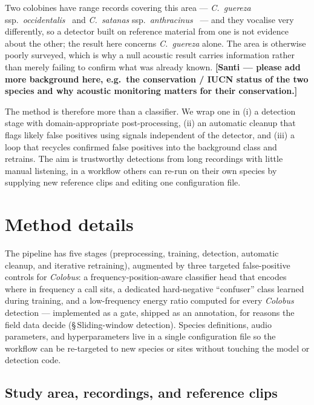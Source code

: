 \documentclass[review,3p,times]{elsarticle}
\begin{document}
Two colobines have range records covering this area --- \textit{C.\ guereza}
ssp.\ \textit{occidentalis}~\cite{iucnguereza2025} and \textit{C.\ satanas}
ssp.\ \textit{anthracinus}~\cite{iucnsatanas2020} --- and they vocalise very
differently, so a detector built on reference material from one is not evidence
about the other; the result here concerns \textit{C.\ guereza} alone. The area
is otherwise poorly surveyed, which is why a null acoustic result carries
information rather than merely failing to confirm what was already known.
\textbf{[Santi --- please add more background here, e.g.\ the conservation /
IUCN status of the two species and why acoustic monitoring matters for their
conservation.]}

The method is therefore more than a classifier. We wrap one in (i) a detection stage with
domain-appropriate post-processing, (ii) an automatic cleanup that flags likely
false positives using signals independent of the detector, and (iii) a loop that
recycles confirmed false positives into the background class and retrains. The
aim is trustworthy detections from long recordings with little manual listening,
in a workflow others can re-run on their own species by supplying new reference
clips and editing one configuration file.

\section*{Method details}

The pipeline has five stages (preprocessing, training, detection, automatic
cleanup, and iterative retraining), augmented by three targeted
false-positive controls for \textit{Colobus}: a frequency-position-aware
classifier head that encodes where in frequency a call sits, a
dedicated hard-negative ``confuser'' class learned during training, and a
low-frequency energy ratio computed for every \textit{Colobus} detection ---
implemented as a gate, shipped as an annotation, for reasons the field data
decide (\S\,Sliding-window detection). Species definitions, audio parameters,
and hyperparameters live in a single configuration file so
the workflow can be re-targeted to new species or sites without touching the
model or detection code.

\subsection*{Study area, recordings, and reference clips}
\end{document}
